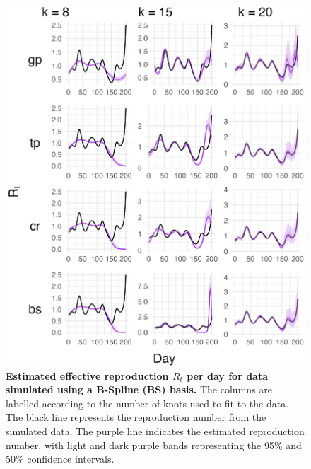 \documentclass[
11pt, %
oneside, %
english, %
singlespacing, %
]{macthesis} %
\begin{document}
\begin{figure}[H]
\centering
\includegraphics[width=\textwidth]{figure/Simulated/unaggregated/simulation_bs_20_k(5,10,20)_bsd1_beta1_plot_R_t.png}
\caption[Estimated Simulated Data (BS) Effective Reproduction Number]{\textbf{Estimated effective reproduction \(R_t\) per day for data simulated using a B-Spline (BS) basis.} The columns are labelled according to the number of knots used to fit to the data. The black line represents the reproduction number from the simulated data. The purple line indicates the estimated reproduction number, with light and dark purple bands representing the 95\% and 50\% confidence intervals.}
\label{fig:Rt20bs}
\end{figure}
\end{document}
